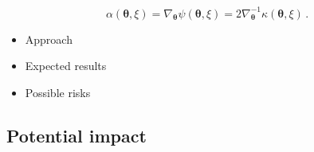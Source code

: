 \documentclass[a4paper,10pt]{article}
\begin{document}
\begin{equation}
  \alpha(\bm\theta,\xi) = \nabla_{\bm\theta}\psi(\bm\theta,\xi) = 2\nabla_{\bm\theta}^{-1}\kappa(\bm\theta,\xi) \,.
\end{equation}


\begin{itemize}
\item Approach
\item Expected results
\item Possible risks
\end{itemize}


\subsection*{Potential impact}
\label{sec:orgeed4ca2}





\end{document}
